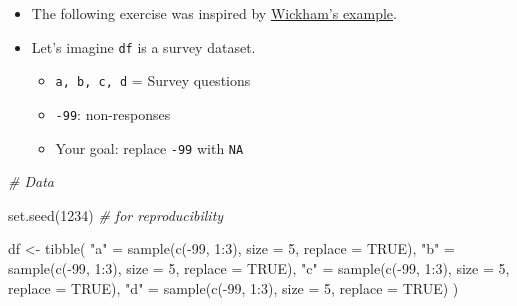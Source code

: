 \documentclass[
]{book}
\newenvironment{Shaded}{\begin{snugshade}}{\end{snugshade}}
\newcommand{\AttributeTok}[1]{\textcolor[rgb]{0.77,0.63,0.00}{#1}}
\newcommand{\CommentTok}[1]{\textcolor[rgb]{0.56,0.35,0.01}{\textit{#1}}}
\newcommand{\ConstantTok}[1]{\textcolor[rgb]{0.00,0.00,0.00}{#1}}
\newcommand{\DecValTok}[1]{\textcolor[rgb]{0.00,0.00,0.81}{#1}}
\newcommand{\FunctionTok}[1]{\textcolor[rgb]{0.00,0.00,0.00}{#1}}
\newcommand{\NormalTok}[1]{#1}
\newcommand{\OtherTok}[1]{\textcolor[rgb]{0.56,0.35,0.01}{#1}}
\newcommand{\SpecialCharTok}[1]{\textcolor[rgb]{0.00,0.00,0.00}{#1}}
\newcommand{\StringTok}[1]{\textcolor[rgb]{0.31,0.60,0.02}{#1}}
\begin{document}
\begin{itemize}
\item
  The following exercise was inspired by \href{http://adv-r.had.co.nz/Functional-programming.html}{Wickham's example}.
\item
  Let's imagine \texttt{df} is a survey dataset.

  \begin{itemize}
  \item
    \texttt{a,\ b,\ c,\ d} = Survey questions
  \item
    \texttt{-99}: non-responses
  \item
    Your goal: replace \texttt{-99} with \texttt{NA}
  \end{itemize}
\end{itemize}

\begin{Shaded}
\begin{Highlighting}[]
\CommentTok{\# Data}

\FunctionTok{set.seed}\NormalTok{(}\DecValTok{1234}\NormalTok{) }\CommentTok{\# for reproducibility}

\NormalTok{df }\OtherTok{\textless{}{-}} \FunctionTok{tibble}\NormalTok{(}
  \StringTok{"a"} \OtherTok{=} \FunctionTok{sample}\NormalTok{(}\FunctionTok{c}\NormalTok{(}\SpecialCharTok{{-}}\DecValTok{99}\NormalTok{, }\DecValTok{1}\SpecialCharTok{:}\DecValTok{3}\NormalTok{), }\AttributeTok{size =} \DecValTok{5}\NormalTok{, }\AttributeTok{replace =} \ConstantTok{TRUE}\NormalTok{),}
  \StringTok{"b"} \OtherTok{=} \FunctionTok{sample}\NormalTok{(}\FunctionTok{c}\NormalTok{(}\SpecialCharTok{{-}}\DecValTok{99}\NormalTok{, }\DecValTok{1}\SpecialCharTok{:}\DecValTok{3}\NormalTok{), }\AttributeTok{size =} \DecValTok{5}\NormalTok{, }\AttributeTok{replace =} \ConstantTok{TRUE}\NormalTok{),}
  \StringTok{"c"} \OtherTok{=} \FunctionTok{sample}\NormalTok{(}\FunctionTok{c}\NormalTok{(}\SpecialCharTok{{-}}\DecValTok{99}\NormalTok{, }\DecValTok{1}\SpecialCharTok{:}\DecValTok{3}\NormalTok{), }\AttributeTok{size =} \DecValTok{5}\NormalTok{, }\AttributeTok{replace =} \ConstantTok{TRUE}\NormalTok{),}
  \StringTok{"d"} \OtherTok{=} \FunctionTok{sample}\NormalTok{(}\FunctionTok{c}\NormalTok{(}\SpecialCharTok{{-}}\DecValTok{99}\NormalTok{, }\DecValTok{1}\SpecialCharTok{:}\DecValTok{3}\NormalTok{), }\AttributeTok{size =} \DecValTok{5}\NormalTok{, }\AttributeTok{replace =} \ConstantTok{TRUE}\NormalTok{)}
\NormalTok{)}
\end{Highlighting}
\end{Shaded}
\end{document}
